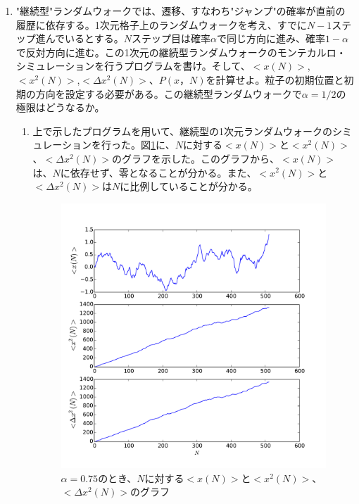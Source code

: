 \documentclass{jsarticle}
\begin{document}
        \begin{enumerate}
            \renewcommand{\labelenumi}{\alph{enumi}.}
            \renewcommand{\labelenumii}{}
            
            \item "継続型"ランダムウォークでは、遷移、すなわち"ジャンプ"の確率が直前の履歴に依存する。1次元格子上のランダムウォークを考え、すでに$N-1$ステップ進んでいるとする。$N$ステップ目は確率$\alpha$で同じ方向に進み、確率$1-\alpha$で反対方向に進む。この1次元の継続型ランダムウォークのモンテカルロ・シミュレーションを行うプログラムを書け。そして、$<x(N)>$,$<x^{2}(N)>$,$<\Delta x^{2}(N)>$、$P(x，N)$を計算せよ。粒子の初期位置と初期の方向を設定する必要がある。この継続型ランダムウォークで$\alpha = 1/2$の極限はどうなるか。
                
                \begin{enumerate}
                    \item 上で示したプログラムを用いて、継続型の1次元ランダムウォークのシミュレーションを行った。図\ref{fig:1}に、$N$に対する$< x(N)> $と$< x^{2}(N)> $、$< \Delta x^{2}(N)> $のグラフを示した。このグラフから、$< x(N)> $は、$N$に依存せず、零となることが分かる。また、$<x^{2}(N)>$と$<\Delta x^{2}(N)>$は$N$に比例していることが分かる。
                    
                    \begin{figure}[H]
                        \begin{center}
                            \includegraphics[width=12.5cm]{figure_1.pdf}
                            \caption{$\alpha=0.75$のとき、$N$に対する$< x(N)> $と$< x^{2}(N)> $、$< \Delta x^{2}(N)> $のグラフ}
                            \label{fig:1}
                        \end{center}
                    \end{figure}
                    

\end{enumerate}
\end{enumerate}
\end{document}

